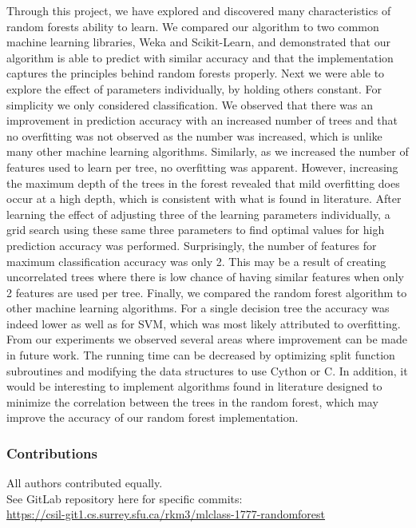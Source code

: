 \documentclass{article} %
\begin{document}
Through this project, we have explored and discovered many characteristics of random forests ability to learn.
We compared our algorithm to two common machine learning libraries, Weka and Scikit-Learn, and demonstrated that our algorithm is able to predict with similar accuracy and that the implementation captures the principles behind random forests properly.
Next we were able to explore the effect of parameters individually, by holding others constant.
For simplicity we only considered classification.
We observed that there was an improvement in prediction accuracy with an increased number of trees and that no overfitting was not observed as the number was increased, which is unlike many other machine learning algorithms.
Similarly, as we increased the number of features used to learn per tree, no overfitting was apparent.
However, increasing the maximum depth of the trees in the forest revealed that mild overfitting does occur at a high depth, which is consistent with what is found in literature.
After learning the effect of adjusting three of the learning parameters individually, a grid search using these same three parameters to find optimal values for high prediction accuracy was performed.
Surprisingly, the number of features for maximum classification accuracy was only 2.
This may be a result of creating uncorrelated trees where there is low chance of having similar features when only 2 features are used per tree.
Finally, we compared the random forest algorithm to other machine learning algorithms.
For a single decision tree the accuracy was indeed lower as well as for SVM, which was most likely attributed to overfitting.
From our experiments we observed several areas where improvement can be made in future work.
The running time can be decreased by optimizing split function subroutines and modifying the data structures to use Cython or C.
In addition, it would be interesting to implement algorithms found in literature designed to minimize the correlation between the trees in the random forest, which may improve the accuracy of our random forest implementation.

\subsubsection*{Contributions}
All authors contributed equally.\\
See GitLab repository here for specific commits:\\
\href{
    https://csil-git1.cs.surrey.sfu.ca/rkm3/mlclass-1777-randomforest
}{
    https://csil-git1.cs.surrey.sfu.ca/rkm3/mlclass-1777-randomforest
}


\small{


}
\end{document}

